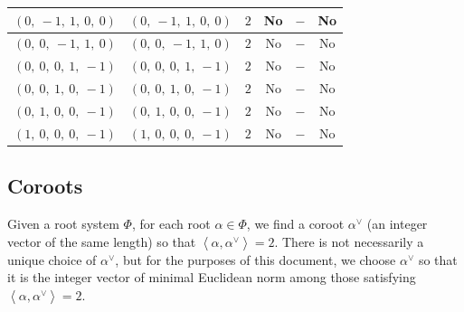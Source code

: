 \documentclass[11pt]{article}
\newcommand{\la}{\left\langle}
\newcommand{\ra}{\right\rangle}
\theoremstyle{definition}
\begin{document}
\begin{tabular}{|l|l|c|c|c|c|}
    \hline
    $\left( 0, \  -1, \  1, \  0, \  0\right)$ & $\left( 0, \  -1, \  1, \  0, \  0\right)$ & $2$ & No & $-$ & No \\
    \hline
    $\left( 0, \  0, \  -1, \  1, \  0\right)$ & $\left( 0, \  0, \  -1, \  1, \  0\right)$ & $2$ & No & $-$ & No \\
    \hline
    $\left( 0, \  0, \  0, \  1, \  -1\right)$ & $\left( 0, \  0, \  0, \  1, \  -1\right)$ & $2$ & No & $-$ & No \\
    \hline
    $\left( 0, \  0, \  1, \  0, \  -1\right)$ & $\left( 0, \  0, \  1, \  0, \  -1\right)$ & $2$ & No & $-$ & No \\
    \hline
    $\left( 0, \  1, \  0, \  0, \  -1\right)$ & $\left( 0, \  1, \  0, \  0, \  -1\right)$ & $2$ & No & $-$ & No \\
    \hline
    $\left( 1, \  0, \  0, \  0, \  -1\right)$ & $\left( 1, \  0, \  0, \  0, \  -1\right)$ & $2$ & No & $-$ & No \\
    \hline
\end{tabular}


\subsection{Coroots}

Given a root system $\Phi$, for each root $\alpha \in \Phi$, we find a coroot $\alpha^\vee$ (an integer vector of the same length) so that $\la \alpha, \alpha^\vee \ra = 2$. There is not necessarily a unique choice of $\alpha^\vee$, but for the purposes of this document, we choose $\alpha^\vee$ so that it is the integer vector of minimal Euclidean norm among those satisfying $\la \alpha, \alpha^\vee \ra = 2$.

\bigskip
\end{document}
